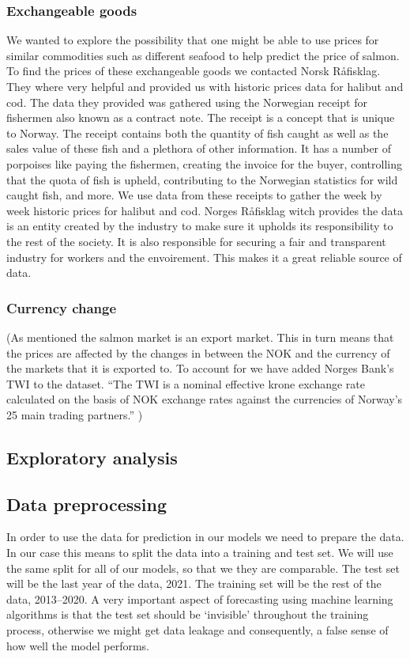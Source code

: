 \subsubsection{Exchangeable goods}\label{Exchangeable goods}
We wanted to explore the possibility that one might be able to use prices for similar commodities such as different seafood to help predict the price of salmon. To find the prices of these exchangeable goods we contacted Norsk Råfisklag. They where very helpful and provided us with historic prices data for halibut and cod. The data they provided was gathered using the Norwegian receipt for fishermen also known as a contract note. The receipt is a concept that is unique to Norway. The receipt contains both the quantity of fish caught as well as the sales value of these fish and a plethora of other information. It has a number of porpoises like paying the fishermen, creating the invoice for the buyer, controlling that the quota of fish is upheld, contributing to the Norwegian statistics for wild caught fish, and more. We use data from these receipts to gather the week by week historic prices for halibut and cod. Norges Råfisklag witch provides the data is an entity created by the industry to make sure it upholds its responsibility to the rest of the society. It is also responsible for securing a fair and transparent industry for workers and the envoirement. This makes it a great reliable source of data.\parencite{Harland_2022}

\subsubsection{Currency change}\label{Currency change}
(As mentioned the salmon market is an export market. This in turn means that the prices are affected by the changes in between the NOK and the currency of the markets that it is exported to. To account for we have added Norges Bank's TWI to the dataset. ``The TWI is a nominal effective krone exchange rate calculated on the basis of NOK exchange rates against the currencies of Norway's 25 main trading partners.'' \parencite{norges_Bank_2020})

\subsection{Exploratory analysis}

\subsection{Data preprocessing}
In order to use the data for prediction in our models we need to prepare the data. In our case this means to split the data into a training and test set. We will use the same split for all of our models, so that we they are comparable. The test set will be the last year of the data, 2021. The training set will be the rest of the data, 2013--2020. A very important aspect of forecasting using machine learning algorithms is that the test set should be `invisible' throughout the training process, otherwise we might get data leakage and consequently, a false sense of how well the model performs.~\parencite{brownlee_2016}
